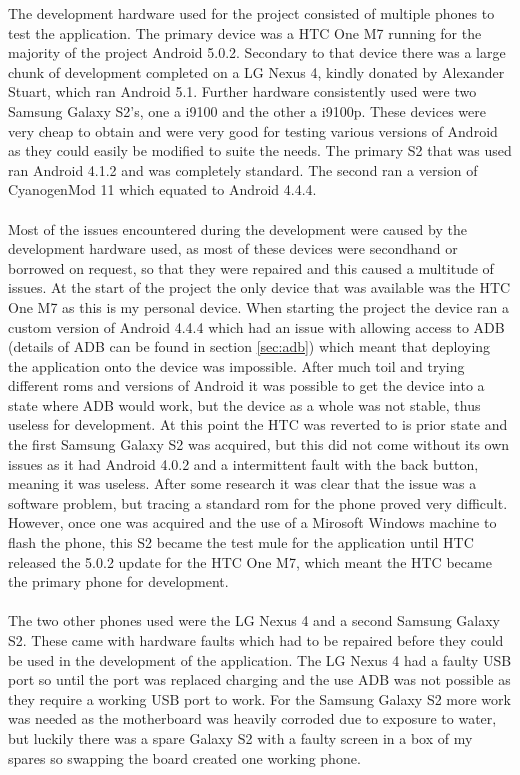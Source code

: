 The development hardware used for the project consisted of multiple phones to test the application. The primary device was a HTC One M7 running for the majority of the project Android 5.0.2. Secondary to that device there was a large chunk of development completed on a LG Nexus 4, kindly donated by Alexander Stuart, which ran Android 5.1. Further hardware consistently used were two Samsung Galaxy S2's, one a i9100 and the other a i9100p. These devices were very cheap to obtain and were very good for testing various versions of Android as they could easily be modified to suite the needs. The primary S2 that was used ran Android 4.1.2 and was completely standard. The second ran a version of CyanogenMod 11 which equated to Android 4.4.4.\\
\\
Most of the issues encountered during the development were caused by the development hardware used, as most of these devices were secondhand or borrowed on request, so that they were repaired and this caused a multitude of issues. At the start of the project the only device that was available was the HTC One M7 as this is my personal device. When starting the project the device ran a custom version of Android 4.4.4 which had an issue with allowing access to ADB (details of ADB can be found in section \ref{sec:adb}) which meant that deploying the application onto the device was impossible. After much toil and trying different roms and versions of Android it was possible to get the device into a state where ADB would work, but the device as a whole was not stable, thus useless for development. At this point the HTC was reverted to is prior state and the first Samsung Galaxy S2 was acquired, but this did not come without its own issues as it had Android 4.0.2 and a intermittent fault with the back button, meaning it was useless. After some research it was clear that the issue was a software problem, but tracing a standard rom for the phone proved very difficult. However, once one was acquired and the use of a Mirosoft Windows machine to flash the phone, this S2 became the test mule for the application until HTC released the 5.0.2 update for the HTC One M7, which meant the HTC became the primary phone for development.\\
\\
The two other phones used were the LG Nexus 4 and a second Samsung Galaxy S2. These came with hardware faults which had to be repaired before they could be used in the development of the application. The LG Nexus 4 had a faulty USB port so until the port was replaced charging and the use ADB was not possible as they require a working USB port to work. For the Samsung Galaxy S2 more work was needed as the motherboard was heavily corroded due to exposure to water, but luckily there was a spare Galaxy S2 with a faulty screen in a box of my spares so swapping the board created one working phone.\\
